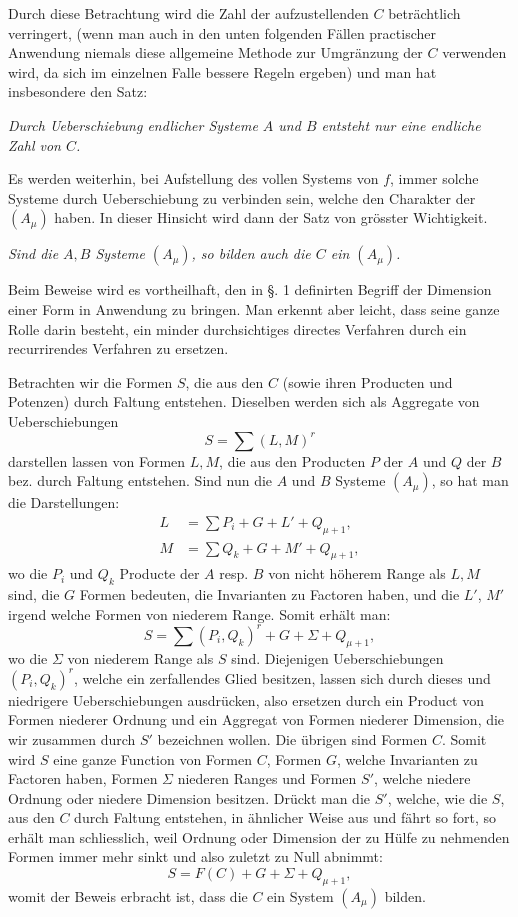 \documentclass[10pt]{article}
\begin{document}
Durch diese Betrachtung wird die Zahl der aufzustellenden $C$ beträchtlich verringert, (wenn man auch in den unten folgenden Fällen practischer Anwendung niemals diese allgemeine Methode zur Umgränzung der $C$ verwenden wird, da sich im einzelnen Falle bessere Regeln ergeben) und man hat insbesondere den Satz:

\emph{Durch Ueberschiebung endlicher Systeme $A$ und $B$ entsteht nur eine endliche Zahl von $C$.}

Es werden weiterhin, bei Aufstellung des vollen Systems von $f$, immer solche Systeme durch Ueberschiebung zu verbinden sein, welche den Charakter der $(A_\mu)$ haben. In dieser Hinsicht wird dann der Satz von grösster Wichtigkeit.

\emph{Sind die $A,B$ Systeme $(A_\mu)$, so bilden auch die $C$ ein $(A_\mu)$.}

Beim Beweise wird es vortheilhaft, den in §. 1 definirten Begriff der Dimension einer Form in Anwendung zu bringen. Man erkennt aber leicht, dass seine ganze Rolle darin besteht, ein minder durchsichtiges directes Verfahren durch ein recurrirendes Verfahren zu ersetzen.

Betrachten wir die Formen $S$, die aus den $C$ (sowie ihren Producten und Potenzen) durch Faltung entstehen. Dieselben werden sich als Aggregate von Ueberschiebungen
\[
S=\sum(L,M)^r
\]
darstellen lassen von Formen $L,M$, die aus den Producten $P$ der $A$ und $Q$ der $B$ bez. durch Faltung entstehen. Sind nun die $A$ und $B$ Systeme $(A_\mu)$, so hat man die Darstellungen:
\[
\begin{aligned}
L&=\sum P_i+G+L'+Q_{\mu+1},\\
M&=\sum Q_k+G+M'+Q_{\mu+1},
\end{aligned}
\]
wo die $P_i$ und $Q_k$ Producte der $A$ resp. $B$ von nicht höherem Range als $L,M$ sind, die $G$ Formen bedeuten, die Invarianten zu Factoren haben, und die $L'$, $M'$ irgend welche Formen von niederem Range. Somit erhält man:
\[
S=\sum(P_i,Q_k)^r+G+\Sigma+Q_{\mu+1},
\]
wo die $\Sigma$ von niederem Range als $S$ sind. Diejenigen Ueberschiebungen $(P_i,Q_k)^r$, welche ein zerfallendes Glied besitzen, lassen sich durch dieses und niedrigere Ueberschiebungen ausdrücken, also ersetzen durch ein Product von Formen niederer Ordnung und ein Aggregat von Formen niederer Dimension, die wir zusammen durch $S'$ bezeichnen wollen. Die übrigen sind Formen $C$. Somit wird $S$ eine ganze Function von Formen $C$, Formen $G$, welche Invarianten zu Factoren haben, Formen $\Sigma$ niederen Ranges und Formen $S'$, welche niedere Ordnung oder niedere Dimension besitzen. Drückt man die $S'$, welche, wie die $S$, aus den $C$ durch Faltung entstehen, in ähnlicher Weise aus und fährt so fort, so erhält man schliesslich, weil Ordnung oder Dimension der zu Hülfe zu nehmenden Formen immer mehr sinkt und also zuletzt zu Null abnimmt:
\[
S=F(C)+G+\Sigma+Q_{\mu+1},
\]
womit der Beweis erbracht ist, dass die $C$ ein System $(A_\mu)$ bilden.
\end{document}
